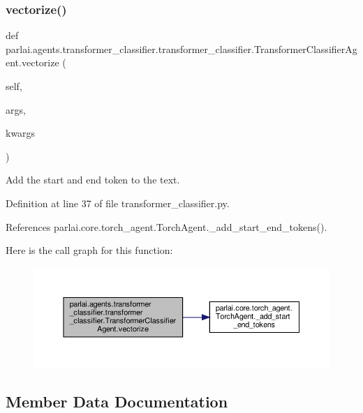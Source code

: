 \subsubsection{\texorpdfstring{vectorize()}{vectorize()}}
{\footnotesize\ttfamily def parlai.\+agents.\+transformer\+\_\+classifier.\+transformer\+\_\+classifier.\+Transformer\+Classifier\+Agent.\+vectorize (\begin{DoxyParamCaption}\item[{}]{self,  }\item[{}]{args,  }\item[{}]{kwargs }\end{DoxyParamCaption})}

\begin{DoxyVerb}Add the start and end token to the text.
\end{DoxyVerb}
 

Definition at line 37 of file transformer\+\_\+classifier.\+py.



References parlai.\+core.\+torch\+\_\+agent.\+Torch\+Agent.\+\_\+add\+\_\+start\+\_\+end\+\_\+tokens().

Here is the call graph for this function\+:
\nopagebreak
\begin{figure}[H]
\begin{center}
\leavevmode
\includegraphics[width=350pt]{classparlai_1_1agents_1_1transformer__classifier_1_1transformer__classifier_1_1TransformerClassifierAgent_afff32a6e789532e0bf6223b466e43588_cgraph}
\end{center}
\end{figure}


\subsection{Member Data Documentation}
\mbox{\label{classparlai_1_1agents_1_1transformer__classifier_1_1transformer__classifier_1_1TransformerClassifierAgent_a9893f246ed245dd63751b31e1ce9b8ef}} 
